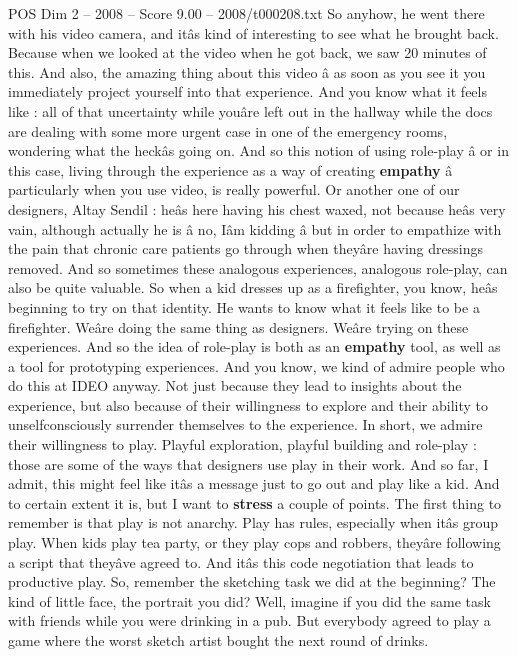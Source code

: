 \begin{textsample}{POS Dim 2 – 2008 – Score 9.00 – 2008/t000208.txt}
So anyhow, he went there with his video camera, and itâs kind of interesting to see what he brought back.
Because when we looked at the video when he got back, we saw 20 minutes of this.
And also, the amazing thing about this video â as soon as you see it you immediately project yourself into that experience.
And you know what it feels like : all of that uncertainty while youâre left out in the hallway while the docs are dealing with some more urgent case in one of the emergency rooms, wondering what the heckâs going on.
And so this notion of using role-play â or in this case, living through the experience as a way of creating \textbf{empathy} â particularly when you use video, is really powerful.
Or another one of our designers, Altay Sendil : heâs here having his chest waxed, not because heâs very vain, although actually he is â no, Iâm kidding â but in order to empathize with the pain that chronic care patients go through when theyâre having dressings removed.
And so sometimes these analogous experiences, analogous role-play, can also be quite valuable.
So when a kid dresses up as a firefighter, you know, heâs beginning to try on that identity.
He wants to know what it feels like to be a firefighter.
Weâre doing the same thing as designers.
Weâre trying on these experiences.
And so the idea of role-play is both as an \textbf{empathy} tool, as well as a tool for prototyping experiences.
And you know, we kind of admire people who do this at IDEO anyway.
Not just because they lead to insights about the experience, but also because of their willingness to explore and their ability to unselfconsciously surrender themselves to the experience.
In short, we admire their willingness to play.
Playful exploration, playful building and role-play : those are some of the ways that designers use play in their work.
And so far, I admit, this might feel like itâs a message just to go out and play like a kid.
And to certain extent it is, but I want to \textbf{stress} a couple of points.
The first thing to remember is that play is not anarchy.
Play has rules, especially when itâs group play.
When kids play tea party, or they play cops and robbers, theyâre following a script that theyâve agreed to.
And itâs this code negotiation that leads to productive play.
So, remember the sketching task we did at the beginning?
The kind of little face, the portrait you did?
Well, imagine if you did the same task with friends while you were drinking in a pub.
But everybody agreed to play a game where the worst sketch artist bought the next round of drinks.

\end{textsample}
